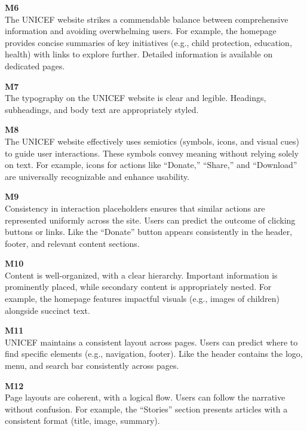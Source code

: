 \begin{description}
    \item {\textbf{M6} \color{unicefGray}{Content (Information overload)}}\\
    The UNICEF website strikes a commendable balance between comprehensive information and avoiding overwhelming users. For example, the homepage provides concise summaries of key initiatives (e.g., child protection, education, health) with links to explore further. Detailed information is available on dedicated pages.
    \item {\textbf{M7} \color{unicefGray}{Text layout}}\\
    The typography on the UNICEF website is clear and legible. Headings, subheadings, and body text are appropriately styled.
    \item {\textbf{M8} \color{unicefGray}{Interaction placeholders (Semiotics)}}\\
    The UNICEF website effectively uses semiotics (symbols, icons, and visual cues) to guide user interactions. These symbols convey meaning without relying solely on text. For example, icons for actions like “Donate,” “Share,” and “Download” are universally recognizable and enhance usability.
    \item {\textbf{M9} \color{unicefGray}{Interaction placeholders (Consistency)}}\\
    Consistency in interaction placeholders ensures that similar actions are represented uniformly across the site. Users can predict the outcome of clicking buttons or links. Like the “Donate” button appears consistently in the header, footer, and relevant content sections.
    \item {\textbf{M10} \color{unicefGray}{Spatial allocation of content}}\\
    Content is well-organized, with a clear hierarchy. Important information is prominently placed, while secondary content is appropriately nested. For example, the homepage features impactful visuals (e.g., images of children) alongside succinct text.
    \item {\textbf{M11} \color{unicefGray}{Consistency of page structure}}\\
    UNICEF maintains a consistent layout across pages. Users can predict where to find specific elements (e.g., navigation, footer). Like the header contains the logo, menu, and search bar consistently across pages.
    \item {\textbf{M12} \color{unicefGray}{Coherence in page layouts}}\\
    Page layouts are coherent, with a logical flow. Users can follow the narrative without confusion. For example, the “Stories” section presents articles with a consistent format (title, image, summary).
\end{description}

